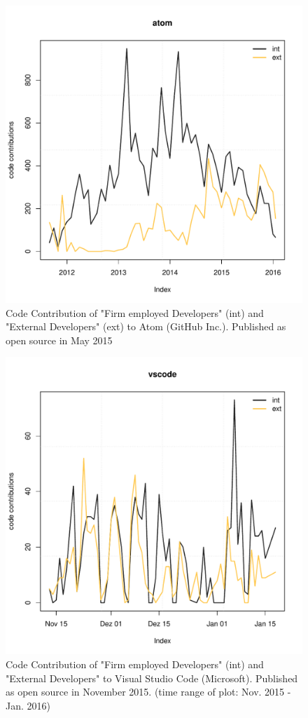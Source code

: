 \begin{figure}[!h]
	\centering
	\includegraphics[page=1,scale=0.5]{../graphics/plots/timeseries/atom_vs_vscode/timeseries_repos_atom.pdf}
	\caption{Code Contribution of "Firm employed Developers" (int) and "External Developers" (ext) to Atom (GitHub Inc.). Published as open source in May 2015}
	\label{fig:codecontributionatomeditor}
\end{figure}

\begin{figure}[!h]
	\centering
	\includegraphics[page=1,scale=0.5]{../graphics/plots/timeseries/atom_vs_vscode/timeseries_repos_vscode.pdf}
	\caption{Code Contribution of "Firm employed Developers" (int) and "External Developers" to Visual Studio Code (Microsoft). Published as open source in November 2015. (time range of plot: Nov. 2015 - Jan. 2016)}
	\label{fig:codecontributionvsc}
\end{figure}

